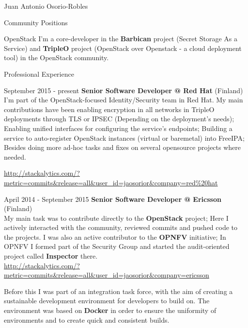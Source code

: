 \documentclass[english,10pt,letterpaper]{article}
\begin{document}
\begin{cv}{Juan Antonio Osorio-Robles}
    \begin{cvlist}{Community Positions}
		\item [OpenStack]
            I'm a core-developer in the \textbf{Barbican} project (Secret
            Storage As a Service) and \textbf{TripleO} project (OpenStack
            over Openstack - a cloud deployment tool) in the OpenStack
            community.
	\end{cvlist}

	\begin{cvlist}{Professional Experience}
		\item [September 2015 - present]
            \textbf{Senior Software Developer @ Red Hat} (Finland)\\
            I'm part of the OpenStack-focused Identity/Security team in Red
            Hat. My main contributions have been enabling encryption in all
            networks in TripleO deployments through TLS or IPSEC (Depending on
            the deployment's needs); Enabling unified interfaces for
            configuring the service's endpoints; Building a service to
            auto-register OpenStack instances (virtual or baremetal) into
            FreeIPA; Besides doing more ad-hoc tasks and fixes on several
            opensource projects where needed.

            \href{http://stackalytics.com/?metric=commits&release=all&user_id=jaosorior&company=red\%20hat}
            {\url{http://stackalytics.com/?metric=commits&release=all&user_id=jaosorior&company=red\%20hat}}

		\item [April 2014 - September 2015]
            \textbf{Senior Software Developer @ Ericsson} (Finland)\\
            My main task was to contribute directly to the
            \textbf{OpenStack} project; Here I actively interacted with the
            community, reviewed commits and pushed code to the projects.
            I was also an active contributor to the \textbf{OPNFV}
            initiative; In OPNFV I formed part of the Security Group and
            started the audit-oriented project called \textbf{Inspector}
            there.\\

            \href{http://stackalytics.com/?metric=commits&release=all&user_id=jaosorior&company=ericsson}
            {\url{http://stackalytics.com/?metric=commits&release=all&user_id=jaosorior&company=ericsson}}

            Before this I was part of an integration task force, with the
            aim of creating a sustainable development environment for
            developers to build on. The environment was based on
            \textbf{Docker} in order to ensure the uniformity of
            environments and to create quick and consistent builds.\\


\end{cvlist}
\end{cv}
\end{document}
